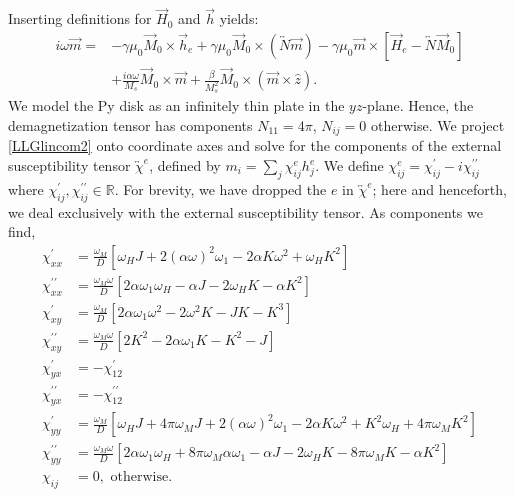 \documentclass{article}
\begin{document}
Inserting definitions for $\vec{H}_{0}$ and $\vec{h}$ yields:
\begin{align}\label{LLGlincom2}
i \omega \vec{m} = &- \gamma \mu_{0} \vec{M}_{0} \times \vec{h}_{e} + \gamma \mu_{0} \vec{M}_{0} \times \left( \overleftrightarrow{N} \vec{m} \right) - \gamma \mu_{0} \vec{m} \times \left[ \vec{H}_{e} - \overleftrightarrow{N} \vec{M}_{0} \right] \nonumber \\
&+ \frac{i \alpha \omega}{M_{s}} \vec{M}_{0} \times \vec{m} + \frac{\beta}{M_{s}^2} \vec{M}_{0} \times \left( \vec{m} \times \hat{z} \right).
\end{align}
We model the Py disk as an infinitely thin plate in the $yz$-plane. 
Hence, the demagnetization tensor has components $N_{11} = 4 \pi$, $N_{ij} = 0$ otherwise. 
We project \eqref{LLGlincom2} onto coordinate axes and solve for the components of the external susceptibility tensor $\overleftrightarrow{\chi}^{e}$, defined by $m_{i} = \sum_{j} \chi_{ij}^{e} h_{j}^{e}$. 
We define $\chi_{ij}^{e} = \chi_{ij}^{\prime} - i \chi_{ij}^{\prime\prime}$ where $\chi_{ij}^{\prime} , \chi_{ij}^{\prime\prime} \in \mathbb{R}$. 
For brevity, we have dropped the $e$ in $\overleftrightarrow{\chi}^{e}$; here and henceforth, we deal exclusively with the external susceptibility tensor. 
As components we find,
\begin{align}
\chi_{xx}^{\prime} &= \frac{\omega_{M}}{D}\left[ \omega_{H} J + 2 \left( \alpha \omega \right)^2 \omega_{1} - 2 \alpha K \omega^2 + \omega_{H} K^2 \right] \\
\chi_{xx}^{\prime\prime} &= \frac{\omega_{M} \omega}{D}\left[ 2 \alpha \omega_{1} \omega_{H} - \alpha J - 2 \omega_{H} K - \alpha K^2 \right] \\
\chi_{xy}^{\prime} &= \frac{\omega_{M}}{D} \left[ 2 \alpha \omega_{1} \omega^2 - 2 \omega^2 K - J K - K^3 \right] \\
\chi_{xy}^{\prime\prime} &= \frac{\omega_{M} \omega}{D} \left[ 2 K^2 - 2 \alpha \omega_{1} K - K^2 - J \right] \\
\chi_{yx}^{\prime} &= - \chi_{12}^{\prime} \\
\chi_{yx}^{\prime\prime} &= - \chi_{12}^{\prime\prime} \\
\chi_{yy}^{\prime} &= \frac{\omega_{M}}{D} \left[ \omega_{H} J + 4 \pi \omega_{M} J + 2 \left(\alpha \omega \right)^2 \omega_{1} - 2 \alpha K \omega^2 + K^2 \omega_{H} + 4 \pi \omega_{M} K^2 \right] \\
\chi_{yy}^{\prime\prime} &= \frac{\omega_{M} \omega}{D} \left[ 2 \alpha \omega_{1} \omega_{H} + 8 \pi \omega_{M} \alpha \omega_{1} - \alpha J - 2 \omega_{H} K - 8 \pi \omega_{M} K - \alpha K^2 \right] \\
\chi_{ij} &= 0, \text{ otherwise}.
\end{align}
\end{document}
